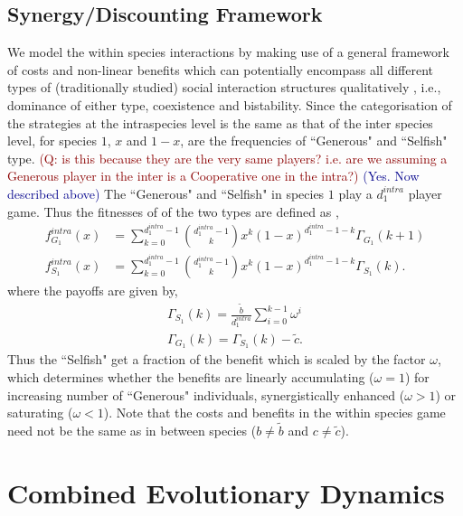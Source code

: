 \documentclass[12pt]{article}
\newcommand{\cha}[1]{\textcolor{darkblue}{(#1)}}
\newcommand{\marcus}[1]{\textcolor{darkred}{(#1)}}
\begin{document}
\begin{appendices}
\subsection*{Synergy/Discounting Framework}
We model the within species interactions by making use of a general framework of costs and non-linear benefits \citep{eshel:AmNat:1988,hauert:JTB:2006a} which can potentially encompass all different types of (traditionally studied) social interaction structures qualitatively \citep{nowak:book:2006}, i.e., dominance of either type, coexistence and bistability.
Since the categorisation of the strategies at the intraspecies level is the same as that of the inter species level, for species $1$, $x$ and $1-x$, are the frequencies of ``Generous" and ``Selfish" type. \marcus{Q: is this because they are the very same players? i.e. are we assuming a Generous player in the inter is a Cooperative one in the intra?}
\cha{Yes. Now described above}
The ``Generous" and ``Selfish" in species $1$ play a $d_1^{intra}$ player game.
Thus the fitnesses of of the two types are defined as \citep{hauert:JTB:2006a},
%
\begin{align}
	f^{intra}_{G_1} (x) &= \sum_{k=0}^{d_1^{intra} -1} \binom{d_1^{intra} -1}{k}x^k (1-x)^{d_1^{intra} -1-k} \Gamma_{G_1}(k+1)  \\
	f^{intra}_{S_1} (x) &= \sum_{k=0}^{d_1^{intra} -1} \binom{d_1^{intra} -1}{k}x^k (1-x)^{d_1^{intra} -1-k} \Gamma_{S_1}(k).
\label{intrafiteqs}
\end{align}
%
where the payoffs are given by,
\begin{align}
	\Gamma_{S_1} (k) = \frac{\tilde{b}}{d_1^{intra}} \sum_{i=0}^{k-1} \omega^i  \\
	\Gamma_{G_1} (k) = \Gamma_{S_1} (k) - \tilde{c}.
\label{eqintragamepayoffs}
\end{align}
%
Thus the ``Selfish" get a fraction of the benefit which is scaled by the factor $\omega$, which determines whether the benefits are linearly accumulating ($\omega=1$) for increasing number of ``Generous" individuals, synergistically enhanced ($\omega>1$) or saturating ($\omega<1$).
Note that the costs and benefits in the within species game need not be the same as in between species ($b\neq \tilde{b}$ and $c \neq \tilde{c}$).


\section{Combined Evolutionary Dynamics}
\label{app:combineddyn}


\end{appendices}
\end{document}

